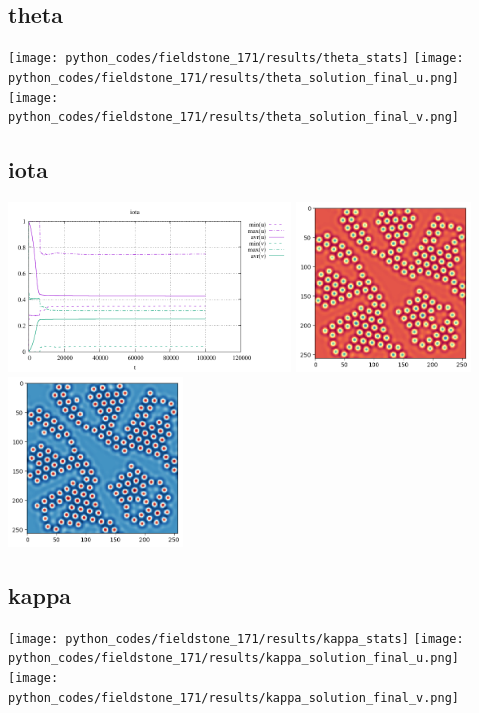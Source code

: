 \subsection*{theta}
\begin{center}
\texttt{[image: python\_codes/fieldstone\_171/results/theta\_stats]}
\texttt{[image: python\_codes/fieldstone\_171/results/theta\_solution\_final\_u.png]}
\texttt{[image: python\_codes/fieldstone\_171/results/theta\_solution\_final\_v.png]}
\end{center}

\subsection*{iota}
\begin{center}
\includegraphics[height=4.5cm]{python_codes/fieldstone_171/results/iota_stats}
\includegraphics[height=4.5cm]{python_codes/fieldstone_171/results/iota_solution_final_u.png}
\includegraphics[height=4.5cm]{python_codes/fieldstone_171/results/iota_solution_final_v.png}
\end{center}

\subsection*{kappa}
\begin{center}
\texttt{[image: python\_codes/fieldstone\_171/results/kappa\_stats]}
\texttt{[image: python\_codes/fieldstone\_171/results/kappa\_solution\_final\_u.png]}
\texttt{[image: python\_codes/fieldstone\_171/results/kappa\_solution\_final\_v.png]}
\end{center}

